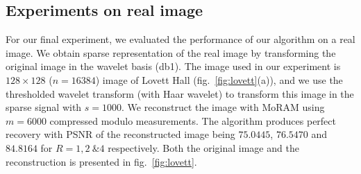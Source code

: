 \subsection{Experiments on real image}
For our final experiment, we evaluated the performance of our algorithm on a real image. We obtain sparse representation of the real image by transforming the original image in the wavelet basis (db1). The image used in our experiment is $128 \times 128$ ($n=16384$) image of Lovett Hall (fig.~\ref{fig:lovett}(a)), and  we use the thresholded wavelet transform (with Haar wavelet) to transform this image in the sparse signal with $s = 1000$. We reconstruct the image with MoRAM using $m = 6000$ compressed modulo measurements. The algorithm produces perfect recovery with PSNR of the reconstructed image being $75.0445$, $ 76.5470$ and $84.8164$ for $R=1,2~\& 4$ respectively. Both the original image and the reconstruction is presented in fig.~\ref{fig:lovett}.
%
